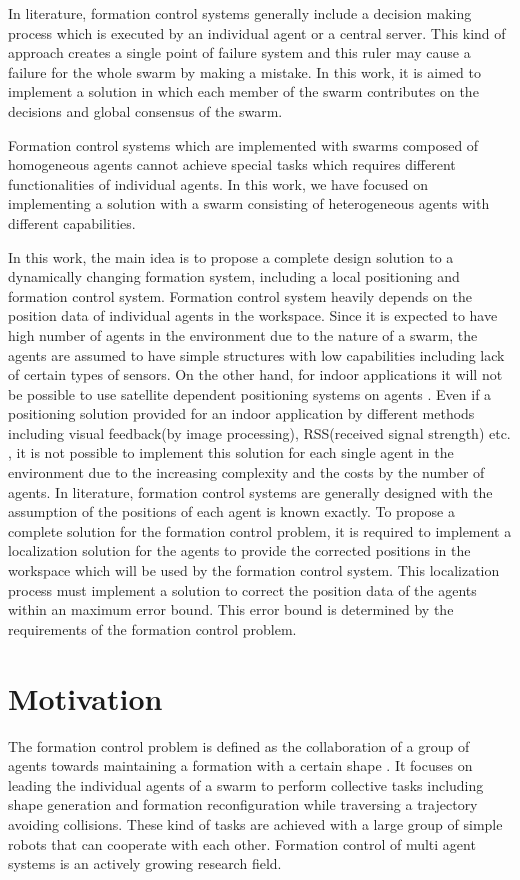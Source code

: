 In literature, formation control systems generally include a decision making process which is executed by an individual agent or a central server. This kind of approach creates a single point of failure system and this ruler may cause a failure for the whole swarm by making a mistake. In this work, it is aimed to implement a solution in which each member of the swarm contributes on the decisions and global consensus of the swarm.

Formation control systems which are implemented with swarms composed of homogeneous agents cannot achieve special tasks which requires different functionalities of individual agents. In this work, we have focused on implementing a solution with a swarm consisting of heterogeneous agents with different capabilities. 

In this work, the main idea is to propose a complete design solution to a dynamically changing formation system, including a local positioning and formation control system. Formation control system heavily depends on the position data of individual agents in the workspace. Since it is expected to have high number of agents in the environment due to the nature of a swarm, the agents are assumed to have simple structures with low capabilities including lack of certain types of sensors. On the other hand, for indoor applications it will not be possible to use satellite dependent positioning systems on agents \cite{19}. Even if a positioning solution provided for an indoor application by different methods including visual feedback(by image processing), RSS(received signal strength) etc. , it is not possible to implement this solution for each single agent in the environment due to the increasing complexity and the costs by the number of agents. In literature, formation control systems are generally designed with the assumption of the positions of each agent is known exactly. To propose a complete solution for the formation control problem, it is required to implement a localization solution for the agents to provide the corrected positions in the workspace which will be used by the formation control system. This localization process must implement a solution to correct the position data of the agents within an maximum error bound. This error bound is determined by the requirements of the formation control problem. 

\section{Motivation}
The formation control problem is defined as the collaboration of a group of agents towards maintaining a formation with a certain shape \cite{12}. It focuses on leading the individual agents of a swarm to perform  collective tasks including shape generation and formation reconfiguration while traversing a trajectory avoiding collisions. These kind of tasks are achieved with a large group of simple robots  that can cooperate with each other. Formation control of multi agent systems  is an actively growing research field.

